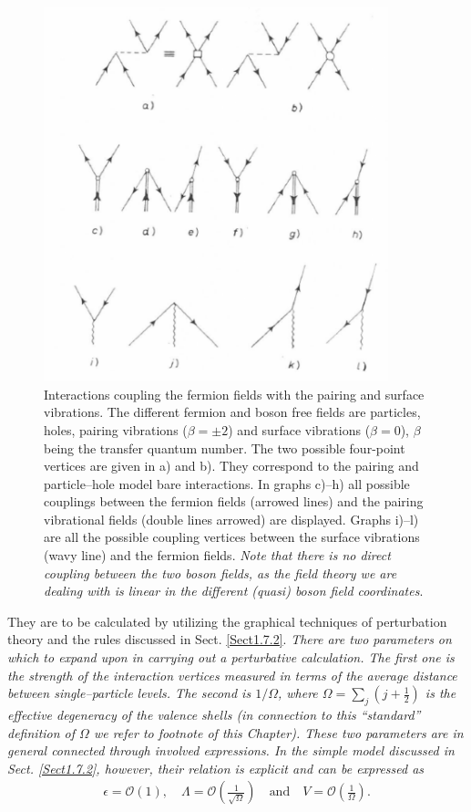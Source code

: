      \begin{figure}
     \centerline {
     \includegraphics*[width=10cm]{introduccion/figs/fig23}
     }
     \caption{Interactions coupling the fermion fields with the pairing and surface vibrations. The different fermion and boson free fields are particles, holes, pairing vibrations ($\beta=\pm2$) and surface vibrations ($\beta=0$), $\beta$ being the transfer quantum number. The two possible four-point vertices are given in a) and b). They correspond to the pairing and particle--hole model bare interactions. In graphs c)--h) all possible couplings between the fermion fields (arrowed lines) and the pairing vibrational fields (double lines arrowed) are displayed. Graphs i)--l) are all the possible coupling vertices between the surface vibrations (wavy line) and the fermion fields. \textit{Note that there is no direct coupling between the two boson fields, as the field theory we are dealing with is linear in the different (quasi) boson field coordinates}.}
     \label{figC1A6}
     \end{figure}

They are to be calculated by utilizing the graphical techniques of perturbation theory and the rules discussed in Sect. \ref{Sect1.7.2}. 
\textit{There are two parameters on which to expand upon in carrying out a perturbative  calculation. The first one is the strength of the interaction vertices measured in terms of the average distance between single--particle levels. The second is $1/\Omega$, where $\Omega=\sum_j(j+\frac{1}{2})$ is the effective degeneracy of the valence shells (in connection to this ``standard'' definition of $\Omega$ we refer to footnote  of this Chapter). These two parameters are in general connected through involved expressions. In the simple model discussed in Sect. \ref{Sect1.7.2}, however, their relation is explicit and can be expressed as}
  \begin{align}\label{eqC1A86} 
   \epsilon=\mathcal O(1),\quad \Lambda=\mathcal O\left(\frac{1}{\sqrt{\Omega}}\right)\quad \text{and}\quad V=\mathcal O\left(\frac{1}{\Omega}\right).
    \end{align}   

